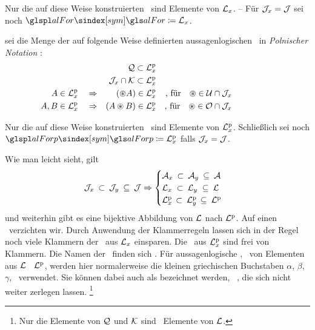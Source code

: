 Nur die auf diese Weise konstruierten \Formeln\ sind Elemente von $\mathcal{L}_x$.
-- Für $\mathcal{J}_x = \mathcal{J}$ sei noch $\glsSym{alFor} \defeq \alFor_x$.

 sei die Menge der auf folgende Weise definierten aussagenlogischen \Formeln\ in \emph{Polnischer Notation}%
:
\begin{align}
	&                                  & \mathcal{Q}              \subset \mathcal{L}^\mathrm{p}_x
	\\
	&                                  & \mathcal{J}_x \cap \mathcal{K} \subset \mathcal{L}^\mathrm{p}_x
	\\
	A    \in \mathcal{L}^\mathrm{p}_x & \quad \Rightarrow &  (\circledast A)         \in     \mathcal{L}^\mathrm{p}_x
	& & \text{, für}  \quad \circledast \in \mathcal{U} \cap \mathcal{J}_x
	\\
	A, B \in \mathcal{L}^\mathrm{p}_x & \quad \Rightarrow & (A \circledast B)        \in     \mathcal{L}^\mathrm{p}_x
	& & \text{, für}  \quad \circledast \in \mathcal{O} \cap \mathcal{J}_x
	&&&&&&&&&&
\end{align}

Nur die auf diese Weise konstruierten \Formeln\ sind Elemente von $\mathcal{L}^\mathrm{p}_x$.
Schließlich sei noch $\glsSym{alForp} \defeq \alForp_x$ falls $\mathcal{J}_x = \mathcal{J}$.

Wie man leicht sieht, gilt
\begin{equation}
	\mathcal{J}_x      \: \subset \: \mathcal{J}_y  \: \subseteq \: \mathcal{J} \Rightarrow
	\begin{cases}
		\mathcal{A}_x  \: \subset \: \mathcal{A}_y  \: \subseteq \: \mathcal{A} \\
		\mathcal{L}_x  \; \subset \: \mathcal{L}_y  \; \subseteq \: \mathcal{L} \\
		\mathcal{L}^\mathrm{p}_x \, \subset \: \mathcal{L}^\mathrm{p}_y \, \subseteq \: \mathcal{L}^\mathrm{p}
	\end{cases}
\end{equation}
und weiterhin gibt es eine bijektive Abbildung von $\mathcal{L}$ nach $\mathcal{L}^\mathrm{p}$. Auf einen \Beweis\ verzichten wir.
%
Durch Anwendung der Klammerregeln  lassen sich in der Regel noch viele Klammern der \Formeln\ aus $\mathcal{L}_x$ einsparen.
Die \Formeln\ aus $\mathcal{L}^\mathrm{p}_x$ sind frei von Klammern.
Die Namen der \Junktoren\ finden sich .
Für aussagenlogische \Formeln, \textdh\ von Elementen aus $\mathcal{L}$ \textbzgl\ $\mathcal{L}^\mathrm{p}$, werden hier normalerweise die kleinen griechischen Buchstaben $\alpha$, $\beta$, $\gamma$, \textusw\ verwendet.
Sie können dabei auch als  bezeichnet werden, \textdh\ \Formeln, die sich nicht weiter zerlegen lassen.%
\footnote{%
	Nur die Elemente von $\mathcal{Q}$ und $\mathcal{K}$ sind \unzerlegbare\ Elemente von $\mathcal{L}$.
}


